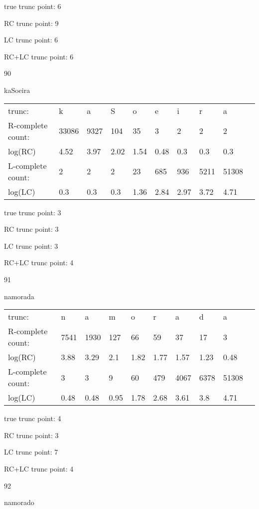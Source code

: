 \documentclass{article}
\begin{document}
true trunc point: 6

RC trunc point: 9

LC trunc point: 6

RC+LC trunc point: 6

\vspace{1em}

90

kaSoeira

\begin{tabular}{l|lllllllll}
trunc: & k & a & S & o & e & i & r & a & \\ 
R-complete count: & 33086 & 9327 & 104 & 35 & 3 & 2 & 2 & 2 & \\ 
log(RC) & 4.52 & 3.97 & 2.02 & 1.54 & 0.48 & 0.3 & 0.3 & 0.3 & \\ 
L-complete count: & 2 & 2 & 2 & 23 & 685 & 936 & 5211 & 51308 & \\ 
log(LC) & 0.3 & 0.3 & 0.3 & 1.36 & 2.84 & 2.97 & 3.72 & 4.71 & \\ 
\end{tabular}

true trunc point: 3

RC trunc point: 3

LC trunc point: 3

RC+LC trunc point: 4

\vspace{1em}

91

namorada

\begin{tabular}{l|lllllllll}
trunc: & n & a & m & o & r & a & d & a & \\ 
R-complete count: & 7541 & 1930 & 127 & 66 & 59 & 37 & 17 & 3 & \\ 
log(RC) & 3.88 & 3.29 & 2.1 & 1.82 & 1.77 & 1.57 & 1.23 & 0.48 & \\ 
L-complete count: & 3 & 3 & 9 & 60 & 479 & 4067 & 6378 & 51308 & \\ 
log(LC) & 0.48 & 0.48 & 0.95 & 1.78 & 2.68 & 3.61 & 3.8 & 4.71 & \\ 
\end{tabular}

true trunc point: 4

RC trunc point: 3

LC trunc point: 7

RC+LC trunc point: 4

\vspace{1em}

92

namorado
\end{document}
